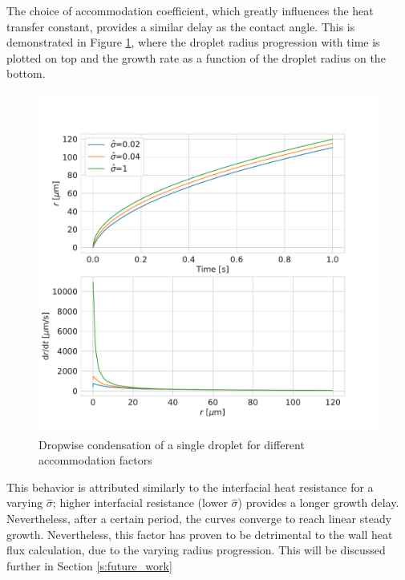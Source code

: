 \documentclass[12pt]{article}
\numberwithin{equation}{section}
\begin{document}
The choice of accommodation coefficient, which greatly influences the heat transfer constant, provides a similar delay as the contact angle. This is demonstrated in Figure \ref{f:dropwise h_i}, where the droplet radius progression with time is plotted on top and the growth rate as a function of the droplet radius on the bottom.
\begin{figure}[H]
    \centering
    \includegraphics[trim={0 0 0 60},clip,width=1.0\textwidth]{Figures/dropwise_sigma_drdt.pdf}
    \caption{Dropwise condensation of a single droplet for different accommodation factors}
    \label{f:dropwise h_i}
\end{figure}
This behavior is attributed similarly to the interfacial heat resistance for a varying $\hat{\sigma}$; higher interfacial resistance (lower $\hat{\sigma}$) provides a longer growth delay. Nevertheless, after a certain period, the curves converge to reach linear steady growth. Nevertheless, this factor has proven to be detrimental to the wall heat flux calculation, due to the varying radius progression. This will be discussed further in Section \ref{s:future_work} 
\end{document}
